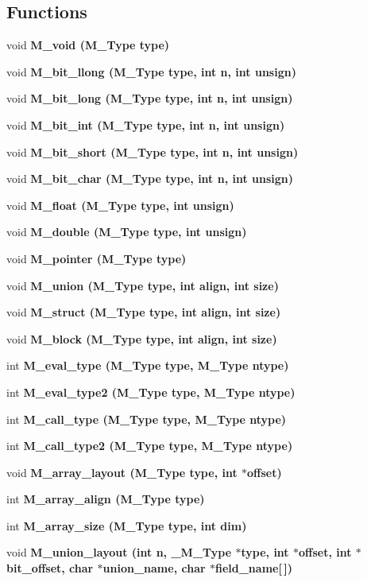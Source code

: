 \subsection*{Functions}
\begin{CompactItemize}
\item 
void \bf{M\_\-void} (\bf{M\_\-Type} type)
\item 
void \bf{M\_\-bit\_\-llong} (\bf{M\_\-Type} type, int n, int unsign)
\item 
void \bf{M\_\-bit\_\-long} (\bf{M\_\-Type} type, int n, int unsign)
\item 
void \bf{M\_\-bit\_\-int} (\bf{M\_\-Type} type, int n, int unsign)
\item 
void \bf{M\_\-bit\_\-short} (\bf{M\_\-Type} type, int n, int unsign)
\item 
void \bf{M\_\-bit\_\-char} (\bf{M\_\-Type} type, int n, int unsign)
\item 
void \bf{M\_\-float} (\bf{M\_\-Type} type, int unsign)
\item 
void \bf{M\_\-double} (\bf{M\_\-Type} type, int unsign)
\item 
void \bf{M\_\-pointer} (\bf{M\_\-Type} type)
\item 
void \bf{M\_\-union} (\bf{M\_\-Type} type, int align, int size)
\item 
void \bf{M\_\-struct} (\bf{M\_\-Type} type, int align, int size)
\item 
void \bf{M\_\-block} (\bf{M\_\-Type} type, int align, int size)
\item 
int \bf{M\_\-eval\_\-type} (\bf{M\_\-Type} type, \bf{M\_\-Type} ntype)
\item 
int \bf{M\_\-eval\_\-type2} (\bf{M\_\-Type} type, \bf{M\_\-Type} ntype)
\item 
int \bf{M\_\-call\_\-type} (\bf{M\_\-Type} type, \bf{M\_\-Type} ntype)
\item 
int \bf{M\_\-call\_\-type2} (\bf{M\_\-Type} type, \bf{M\_\-Type} ntype)
\item 
void \bf{M\_\-array\_\-layout} (\bf{M\_\-Type} type, int $\ast$offset)
\item 
int \bf{M\_\-array\_\-align} (\bf{M\_\-Type} type)
\item 
int \bf{M\_\-array\_\-size} (\bf{M\_\-Type} type, int dim)
\item 
void \bf{M\_\-union\_\-layout} (int n, \bf{\_\-M\_\-Type} $\ast$type, int $\ast$offset, int $\ast$bit\_\-offset, char $\ast$union\_\-name, char $\ast$field\_\-name[$\,$])
\item 

\end{CompactItemize}

